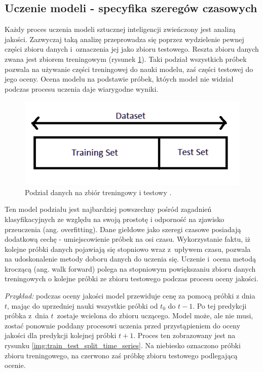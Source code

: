 \documentclass[a4paper, twoside, 11pt, openright]{article}
\begin{document}
\subsection{Uczenie modeli - specyfika szeregów czasowych}

Każdy proces uczenia modeli sztucznej inteligencji zwieńczony jest analizą jakości. Zazwyczaj taką analizę przeprowadza się poprzez wydzielenie pewnej części zbioru danych i~oznaczenia jej jako zbioru testowego. Reszta zbioru danych zwana jest zbiorem treningowym (rysunek \ref{img:train_test_split}). Taki podział wszystkich próbek pozwala na używanie części treningowej do nauki modelu, zaś części testowej do jego oceny. Ocena modelu na podstawie próbek, któych model nie widział podczas procesu uczenia daje wiarygodne wyniki.

\begin{figure}[H]
\centering 
\includegraphics[scale=0.5]{img/train_test_split.png}
\caption{Podział danych na zbiór treningowy i testowy \cite{train_test_split}.}
\label{img:train_test_split}
\end{figure}

Ten model podziału jest najbardziej powszechny pośród zagadnień klasyfikacyjnych ze względu na swoją prostotę i odporność na zjawisko przeuczenia (ang. overfitting). Dane giełdowe jako szeregi czasowe posiadają dodatkową cechę - umiejscowienie próbek na osi czasu. Wykorzystanie faktu, iż kolejne próbki danych pojawiają się stopniowo wraz z~upływem czasu, pozwala na udoskonalenie metody doboru danych do uczenia się. Uczenie i~ocena metodą kroczącą (ang. walk forward) polega na stopniowym powiększaniu zbioru danych treningowych o kolejne próbki ze zbioru testowego podczas procesu oceny jakości. 

\textit{Przykład:} podczas oceny jakości model przewiduje cenę za pomocą próbki z dnia $t$, mając do uprzedniej nauki wszystkie próbki od $t_0$ do $t-1$. Po tej predykcji próbka z~dnia $t$~zostaje wcielona do zbioru uczącego. Model może, ale nie musi, zostać ponownie poddany procesowi uczenia przed przystąpieniem do oceny jakości dla predykcji kolejnej próbki $t+1$. Proces ten zobrazowany jest na rysunku \ref{img:train_test_split_time_series}. Na niebiesko oznaczono próbki zbioru treningowego, na czerwono zaś próbkę zbioru testowego podlegającą ocenie.
\end{document}
